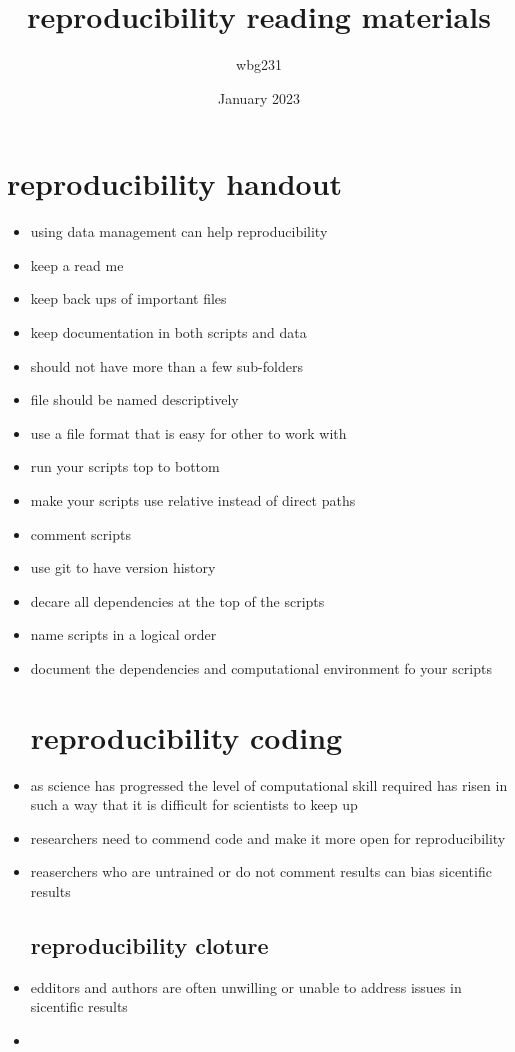 \documentclass{article}
\title{reproducibility reading materials }
\author{wbg231 }
\date{January 2023}
\begin{document}
\maketitle

\section{reproducibility handout}
\begin{itemize}
\item using data management can help reproducibility 
\item keep a read me 
\item keep back ups of important files 
\item keep documentation in both scripts and data
\item should not have more than a few sub-folders 
\item file should be named descriptively
\item use a file format that is easy for other to work with 
\item run your scripts top to bottom 
\item make your scripts use relative instead of direct paths 
\item comment scripts
\item use git to have version history
\item decare all dependencies at the top of the scripts
\item name scripts in a logical order 
\item document the dependencies and computational environment fo your scripts
\section*{reproducibility coding}
\item as science has progressed the level of computational skill required has risen in such a way that it is difficult for scientists to keep up
\item researchers need to commend code and make it more open for reproducibility
\item reaserchers who are untrained or do not comment results can bias sicentific results
\subsection*{reproducibility cloture}
\item edditors and authors are often unwilling or unable to address issues in sicentific results
\item 
\end{itemize}
\end{document}
